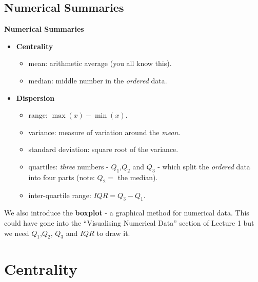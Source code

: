 \documentclass[compress]{beamer}        %
\makeatletter
\newcommand{\tcb}{\textcolor{beamer@blendedblue}}
\makeatother
\begin{document}
\subsection{Numerical Summaries}
\begin{frame}{\bf \tcb{Numerical Summaries}\\[-1cm]}
\begin{itemize}\itemsep0.3cm
\item {\bf Centrality}
\begin{itemize}\itemsep0.2cm
\item mean: arithmetic average (you all know this).
\item median: middle number in the \emph{ordered} data.
\end{itemize}
\item {\bf Dispersion}
\begin{itemize}\itemsep0.2cm
\item range: $\max(x) -\min(x)$.
\item variance: measure of variation around the \emph{mean}.
\item standard deviation: square root of the variance.
\item quartiles: \emph{three} numbers - $Q_1$,$Q_2$ and $Q_3$ - which split the \emph{ordered}\newline\phantom{quartiles:} data into four parts (note: $Q_2 =$ the median).
\item inter-quartile range: $IQR = Q_3 - Q_1$.\\[0.4cm]
\end{itemize}
\end{itemize}
We also introduce the {\bf boxplot} - a graphical method for numerical data. This could have gone into the ``Visualising Numerical Data'' section of Lecture 1 but we need $Q_1$,$Q_2$, $Q_3$ and $IQR$ to draw it.
\end{frame}


\section{Centrality}
\end{document}
